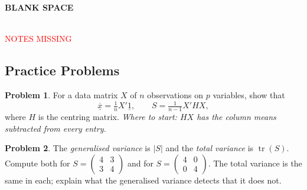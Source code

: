 \documentclass[11pt,a4paper]{article}
\theoremstyle{definition}
\newtheorem{problemx}{Problem}[section]
\newenvironment{problem}{\begin{problemx}}{\end{problemx}}
\begin{document}
\textbf{BLANK SPACE}\\\\




\begin{center}
\textcolor{red}{NOTES MISSING}
\end{center}






























\pagebreak

\newpage

\subsection{Practice Problems}

\begin{problem}
For a data matrix $X$ of $n$ observations on $p$ variables, show that
$$\overline{\underline{x}} = \tfrac{1}{n}X'\underline{1},
\qquad
S = \tfrac{1}{n-1}X'HX,$$
where $H$ is the centring matrix.
\emph{Where to start: $HX$ has the column means subtracted from every entry.}
\end{problem}

\begin{problem}
The \emph{generalised variance} is $\left|S\right|$ and the \emph{total
variance} is $\operatorname{tr}(S)$. Compute both for
$S = \begin{pmatrix} 4 & 3\\ 3 & 4\end{pmatrix}$ and for
$S = \begin{pmatrix} 4 & 0\\ 0 & 4\end{pmatrix}$. The total variance is the
same in each; explain what the generalised variance detects that it does not.
\end{problem}
\end{document}
